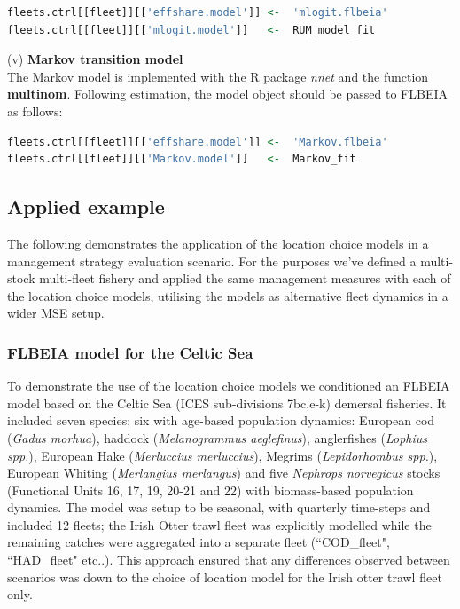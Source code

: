 \documentclass[12pt, halfline, a4paper]{ouparticle}
\begin{document}
\begin{lstlisting}[language=R]
fleets.ctrl[[fleet]][['effshare.model']] <-  'mlogit.flbeia'
fleets.ctrl[[fleet]][['mlogit.model']]   <-  RUM_model_fit
\end{lstlisting}

(v) \textbf{Markov transition model} \\

The Markov model is implemented with the R package \textit{nnet} and the
function \textbf{multinom}. Following estimation, the model object should be
passed to FLBEIA as follows:

\begin{lstlisting}[language=R]
fleets.ctrl[[fleet]][['effshare.model']] <-  'Markov.flbeia'
fleets.ctrl[[fleet]][['Markov.model']]   <-  Markov_fit 
\end{lstlisting}

\subsection{Applied example}

The following demonstrates the application of the location choice models in a
management strategy evaluation scenario. For the purposes we've defined a
multi-stock multi-fleet fishery and applied the same management measures with
each of the location choice models, utilising the models as alternative fleet
dynamics in a wider MSE setup.

\subsubsection{FLBEIA model for the Celtic Sea}

To demonstrate the use of the location choice models we conditioned an FLBEIA
model based on the Celtic Sea (ICES sub-divisions 7bc,e-k) demersal fisheries.
It included seven species; six with age-based population dynamics: European cod
(\textit{Gadus morhua}), haddock (\textit{Melanogrammus aeglefinus}),
anglerfishes (\textit{Lophius spp.}), European Hake (\textit{Merluccius
	merluccius}), Megrims (\textit{Lepidorhombus spp.}), European Whiting
(\textit{Merlangius merlangus}) and five \textit{Nephrops norvegicus} stocks
(Functional Units 16, 17, 19, 20-21 and 22) with biomass-based population
dynamics. The model was setup to be seasonal, with quarterly time-steps and
included 12 fleets; the Irish Otter trawl fleet was explicitly modelled while
the remaining catches were aggregated into a separate fleet (``COD\_fleet",
``HAD\_fleet" etc..). This approach ensured that any differences observed
between scenarios was down to the choice of location model for the Irish otter
trawl fleet only. \\
\end{document}
